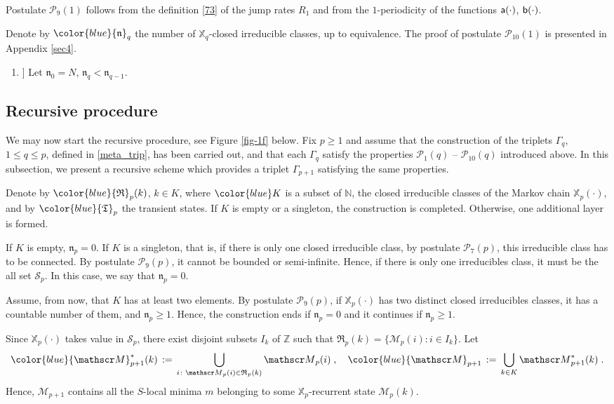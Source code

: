 \documentclass[reqno]{amsart}
\theoremstyle{plain}
\theoremstyle{definition}
\newcommand{\mc}[1]{{\mathcal #1}}
\newcommand{\mf}[1]{{\mathfrak #1}}
\newcommand{\bb}[1]{{\mathbb #1}}
\newcommand{\ms}[1]{{\mathscr #1}}
\newcommand{\mss}[1]{{\textsf #1}}
\newcounter{as}[section]
\newcommand{\<}{\langle}
\renewcommand{\>}{\rangle}
\begin{document}
Postulate $\mc P_9(1)$ follows from the definition \eqref{73} of the
jump rates $R_1$ and from the $1$-periodicity of the functions
$\mss a(\cdot)$, $\mss b(\cdot)$.

Denote by $\color{blue} \mf n_q$ the number of $\bb X_q$-closed
irreducible classes, up to equivalence. The proof of postulate $\mc
P_{10}(1)$ is presented in Appendix \ref{sec4}. 

\begin{enumerate}

\item[[$\mc P_{10}(q)$\!\!\!]] Let $\mf n_0=N$, $\mf n_{q} < \mf n_{q-1}$. 

\end{enumerate}


\subsection*{Recursive procedure}

We may now start the recursive procedure, see Figure \ref{fig-1f}
below. Fix $p\geq 1$ and assume that the construction of the triplets
$\Gamma_{q}$, $1\le q\le p$, defined in \eqref{meta_trip}, has been
carried out, and that each $\Gamma_q$ satisfy the properties
$\mc P_1 (q)$ -- $\mc P_{10}(q)$ introduced above. In this subsection,
we present a recursive scheme which provides a triplet $\Gamma_{p+1} $
satisfying the same properties.

Denote by $\color{blue} \mf R_p(k)$, $k\in K$, where $\color{blue} K$
is a subset of $\bb N$, the closed irreducible classes of the Markov
chain $\bb X_{p}(\cdot)$, and by $\color{blue} \mf T_p$ the transient
states.  If $K$ is empty or a singleton, the construction is
completed.  Otherwise, one additional layer is formed.

If $K$ is empty, $\mf n_p=0$. If $K$ is a singleton, that is, if there
is only one closed irreducible class, by postulate $\mc P_7(p)$, this
irreducible class has to be connected.  By postulate $\ms P_9(p)$, it
cannot be bounded or semi-infinite. Hence, if there is only one
irreducibles class, it must be the all set $\ms S_p$. In this case, we
say that $\mf n_p=0$.

Assume, from now, that $K$ has at least two elements. By postulate
$\ms P_9(p)$, if $\bb X_{p}(\cdot)$ has two distinct closed
irreducibles classes, it has a countable number of them, and $\mf
n_p\ge 1$. Hence, the construction ends if $\mf n_p=0$ and it
continues if $\mf n_p\ge 1$.

Since $\bb X_{p}(\cdot)$ takes value in $\ms S_p$, there exist
disjoint subsets $I_k$ of $\bb Z$ such that
$\mf R_p(k) = \{\ms M_p(i) : i \in I_k\}$. Let
\begin{equation}
\label{24}
{\color{blue}\ms M^*_{p+1}(k)} \,:=\, \bigcup_{i\colon \ms M_p(i)  \in \mf
R_p(k)} \ms M_p(i) \;, \quad
{\color{blue}\ms M_{p+1}} \,:=\, \bigcup_{k\in K} \ms M^*_{p+1}(k)
\;.
\end{equation}
Hence, $\ms M_{p+1}$ contains all the $S$-local minima $m$ belonging
to some $\bb X_p$-recurrent state $\ms M_{p}(k)$.
\end{document}
